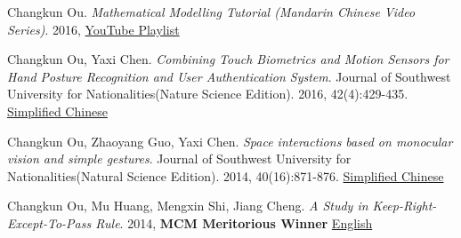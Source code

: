    \item{
       Changkun Ou.
       \emph{Mathematical Modelling Tutorial (Mandarin Chinese Video Series)}.
       2016, \href{https://www.youtube.com/watch?v=EUfXE3vP9_A&list=PLwUqqMt5en7c7iZIseCVAS5BX6RPkS-qR}{YouTube Playlist}
   }
   \item{
       Changkun Ou, Yaxi Chen. 
       \emph{Combining Touch Biometrics and Motion Sensors for Hand Posture Recognition and User Authentication System}. 
       Journal of Southwest University for Nationalities(Nature Science Edition). 
       2016, 42(4):429-435. \href{https://changkun.us/files/cv/touch.swun.html}{Simplified Chinese}
   }
   \item{
       Changkun Ou, Zhaoyang Guo, Yaxi Chen.
       \emph{Space interactions based on monocular vision and simple gestures}. 
       Journal of Southwest University for Nationalities(Natural Science Edition). 
       2014, 40(16):871-876. \href{https://changkun.us/files/cv/vision.swun.html}{Simplified Chinese}
   }
   \item{
       Changkun Ou, Mu Huang, Mengxin Shi, Jiang Cheng. 
       \emph{A Study in Keep-Right-Except-To-Pass Rule}. 
       2014, \textbf{MCM Meritorious Winner} \href{https://changkun.us/files/cv/28922.public.html}{English}
   }
 \resumeSubHeadingListEnd
